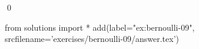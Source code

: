 
\begin{ex} 
  \label{ex:bernoulli-09}
  
  \qed
\end{ex} 
\begin{python0}
from solutions import *
add(label="ex:bernoulli-09",
    srcfilename='exercises/bernoulli-09/answer.tex') 
\end{python0}
